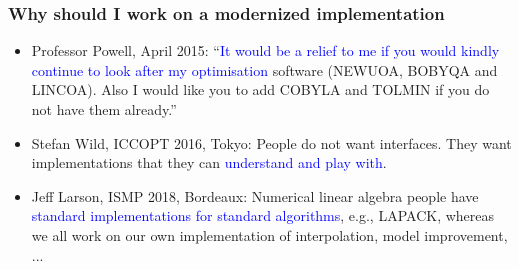 \documentclass[slidestop,mathserif,xcolor=dvipsnames]{beamer}
\newcommand{\blue}[1]{\textcolor{blue}{#1}}
\begin{document}
\begin{frame}
    \frametitle{Why should \textbf{\textrm{I}} work on a modernized implementation}

            \vspace{2ex}
    \begin{itemize}
        \item Professor Powell, April 2015: ``\blue{It would be a relief to me if you would kindly continue
            to look after my optimisation} software (NEWUOA, BOBYQA and LINCOA). Also I would like
            you to add COBYLA and TOLMIN if you do not have them already.''
            \vspace{1ex}
        \item Stefan Wild, ICCOPT 2016, Tokyo: People do not want interfaces. They want
            implementations that they can \blue{understand and play with}.
            \vspace{1ex}
        \item Jeff Larson, ISMP 2018, Bordeaux: Numerical linear algebra people have \blue{standard
            implementations for standard algorithms}, e.g., LAPACK, whereas we all work on our own
            implementation of interpolation, model improvement, ...
    \end{itemize}
\end{frame}
\end{document}
